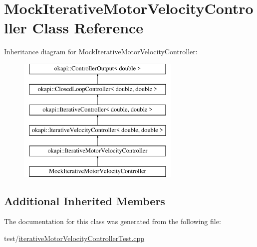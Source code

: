 \hypertarget{classMockIterativeMotorVelocityController}{}\section{Mock\+Iterative\+Motor\+Velocity\+Controller Class Reference}
\label{classMockIterativeMotorVelocityController}
Inheritance diagram for Mock\+Iterative\+Motor\+Velocity\+Controller\+:\begin{figure}[H]
\begin{center}
\leavevmode
\includegraphics[height=6.000000cm]{classMockIterativeMotorVelocityController}
\end{center}
\end{figure}
\subsection*{Additional Inherited Members}


The documentation for this class was generated from the following file\+:\begin{DoxyCompactItemize}
\item 
test/\mbox{\hyperlink{iterativeMotorVelocityControllerTest_8cpp}{iterative\+Motor\+Velocity\+Controller\+Test.\+cpp}}\end{DoxyCompactItemize}
